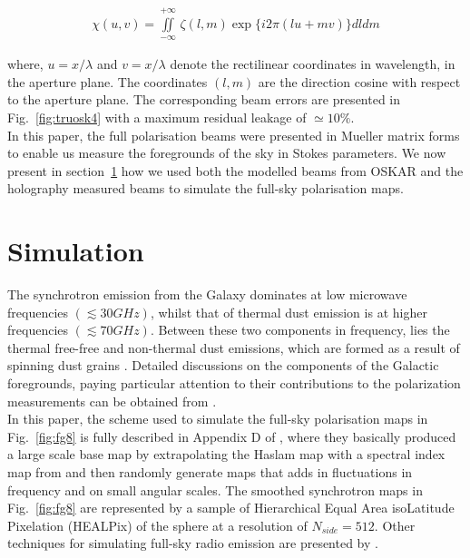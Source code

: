 \documentclass[fleqn,usenatbib]{mnras}
\begin{document}
\begin{equation} 
\begin{aligned}                 
\chi(u, v) = \iint \limits_{-\infty}^{+\infty} \, \zeta(l, m)\exp\{i2\pi(lu + mv)\} dldm 
\end{aligned}
\label{eq:q12}
\end{equation}

\noindent
where, $u = x/\lambda$ and $v = x/\lambda$ denote the rectilinear coordinates in wavelength, in the aperture plane. The coordinates $(l,m)$ are the direction cosine with respect to the aperture plane. The corresponding beam errors are presented in Fig.~\ref{fig:truosk4} with a maximum residual leakage of $\simeq 10 \%$. \\

\noindent
In this paper, the full polarisation beams were presented in Mueller matrix forms to enable us measure the foregrounds of the sky in Stokes parameters. We now present in section~\ref{sec:simulation} how we used both the modelled beams from OSKAR and the holography measured beams to simulate the full-sky polarisation maps.

 \section{Simulation}    \label{sec:simulation}
The synchrotron emission from the Galaxy dominates at low microwave frequencies $(\lesssim 30 GHz)$, whilst that of thermal dust emission is at higher frequencies $(\lesssim 70 GHz)$. Between these two components in frequency, lies the thermal   free-free and non-thermal dust emissions,
 which are formed as a result of spinning dust grains \citep{1996ApJ...464L...1B}. Detailed discussions on the components of the Galactic foregrounds, paying particular attention to their contributions to the polarization measurements can be obtained from  \citep{2014MNRAS.441.3271W,2010MNRAS.409.1647J,2015arXiv150103989S,2015MNRAS.447..400A,kiyotomo2014}. \\


 \noindent
 In this paper, the scheme used to simulate the full-sky polarisation maps in Fig.~\ref{fig:fg8} is fully described in Appendix D of  \citep{2015PhRvD..91h3514S}, where they basically produced a large scale base map by extrapolating the Haslam map \citep{2008PhRvL.100p1301L}  with a  spectral index map from \citep{2008A&A...490.1093M} and then randomly generate maps that adds in fluctuations in frequency and on small angular scales. The smoothed synchrotron maps in Fig.~\ref{fig:fg8} are represented by a sample of  Hierarchical Equal Area isoLatitude Pixelation (HEALPix) of the sphere at a resolution of $N_{side} = 512$.  Other techniques for simulating full-sky radio emission are presented by \citep{2002ApJ...579..607T,2014ApJ...794..171T,2011MNRAS.418..516G,2008MNRAS.389.1319J,2008MNRAS.388..247D}.
 
\end{document}
